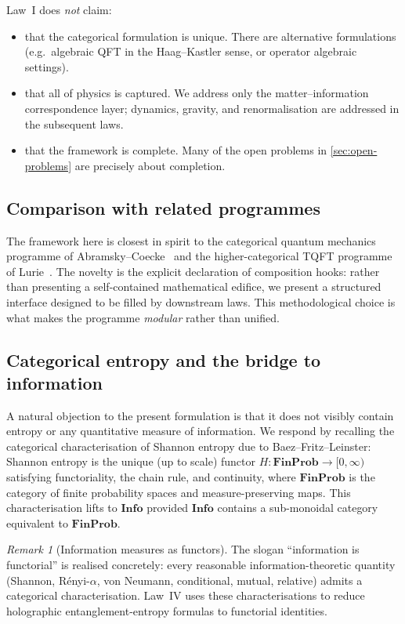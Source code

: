 \documentclass[12pt]{article}
\theoremstyle{definition}
\theoremstyle{remark}
\newtheorem{remark}[theorem]{Remark}
\newcommand{\Info}{\mathbf{Info}}
\begin{document}
Law~I does \emph{not} claim:
\begin{itemize}
\item that the categorical formulation is unique. There are alternative formulations (e.g.\ algebraic QFT in the Haag--Kastler sense, or operator algebraic settings).
\item that all of physics is captured. We address only the matter--information correspondence layer; dynamics, gravity, and renormalisation are addressed in the subsequent laws.
\item that the framework is complete. Many of the open problems in \cref{sec:open-problems} are precisely about completion.
\end{itemize}

\subsection{Comparison with related programmes}

The framework here is closest in spirit to the categorical quantum mechanics programme of Abramsky--Coecke~\cite{abramskycoecke2004} and the higher-categorical TQFT programme of Lurie~\cite{lurie2009}. The novelty is the explicit declaration of composition hooks: rather than presenting a self-contained mathematical edifice, we present a structured interface designed to be filled by downstream laws. This methodological choice is what makes the programme \emph{modular} rather than unified.

\subsection{Categorical entropy and the bridge to information}

A natural objection to the present formulation is that it does not visibly contain entropy or any quantitative measure of information. We respond by recalling the categorical characterisation of Shannon entropy due to Baez--Fritz--Leinster: Shannon entropy is the unique (up to scale) functor $H : \mathbf{FinProb} \to [0,\infty)$ satisfying functoriality, the chain rule, and continuity, where $\mathbf{FinProb}$ is the category of finite probability spaces and measure-preserving maps. This characterisation lifts to $\Info$ provided $\Info$ contains a sub-monoidal category equivalent to $\mathbf{FinProb}$.

\begin{remark}[Information measures as functors]
The slogan ``information is functorial'' is realised concretely: every reasonable information-theoretic quantity (Shannon, R\'enyi-$\alpha$, von Neumann, conditional, mutual, relative) admits a categorical characterisation. Law~IV uses these characterisations to reduce holographic entanglement-entropy formulas to functorial identities.
\end{remark}
\end{document}
